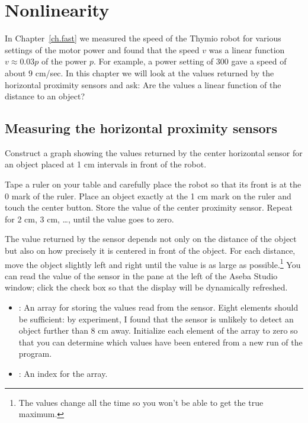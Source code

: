\chapter{Nonlinearity}\label{ch.nonlinear}

In Chapter~\ref{ch.fast} we measured the speed of the Thymio robot for
various settings of the motor power and found that the speed $v$ was a
linear function $v \approx 0.03p$ of the power $p$. For example, a power
setting of $300$ gave a speed of about $9$ cm/sec. In this chapter we
will look at the values returned by the horizontal proximity sensors and
ask: Are the values a linear function of the distance to an object?

\section{Measuring the horizontal proximity sensors}


Construct a graph showing the values returned by the center horizontal
sensor for an object placed at 1 cm intervals in front of
the robot.


Tape a ruler on your table and carefully place the robot so that its
front is at the 0 mark of the ruler. Place an object exactly at the 1
cm mark on the ruler and touch the center button. Store the value of
the center proximity sensor. Repeat for 2 cm, 3 cm, \ldots, until the
value goes to zero.

The value returned by the sensor depends not only on the distance of the
object but also on how precisely it is centered in front of the
object. For each distance, move the object slightly left and right
until the value is as large as possible.\footnote{The values change all
the time so you won't be able to get the true maximum.} You can read the
value of the sensor in the  pane at the left of the Aseba
Studio window; click the check box  so that the display will be
dynamically refreshed.


\begin{itemize}

\item {}: An array for storing the values read from the
sensor. Eight elements should be sufficient: by experiment, I found that
the sensor is unlikely to detect an object further than 8 cm away.
Initialize each element of the array to zero so that you can determine
which values have been entered from a new run of the program.

\item {}: An index for the array. 

\end{itemize}

